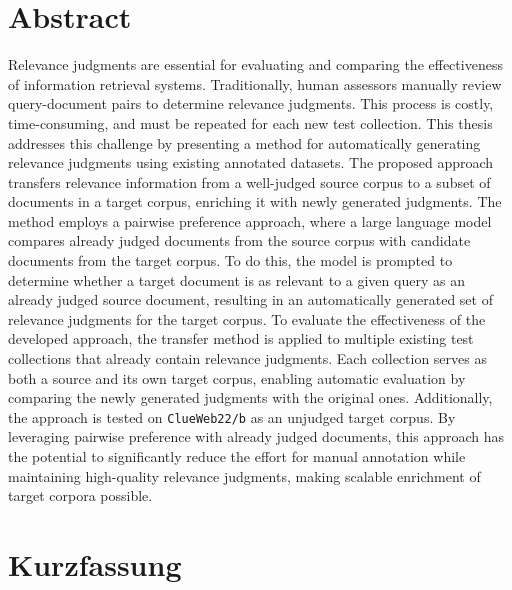 \section*{Abstract}

Relevance judgments are essential for evaluating and comparing the effectiveness of information retrieval systems. Traditionally, human assessors manually review query-document pairs to determine relevance judgments. This process is costly, time-consuming, and must be repeated for each new test collection. This thesis addresses this challenge by presenting a method for automatically generating relevance judgments using existing annotated datasets. The proposed approach transfers relevance information from a well-judged source corpus to a subset of documents in a target corpus, enriching it with newly generated judgments. The method employs a pairwise preference approach, where a large language model compares already judged documents from the source corpus with candidate documents from the target corpus. To do this, the model is prompted to determine whether a target document is as relevant to a given query as an already judged source document, resulting in an automatically generated set of relevance judgments for the target corpus. To evaluate the effectiveness of the developed approach, the transfer method is applied to multiple existing test collections that already contain relevance judgments. Each collection serves as both a source and its own target corpus, enabling automatic evaluation by comparing the newly generated judgments with the original ones. Additionally, the approach is tested on \texttt{ClueWeb22/b} as an unjudged target corpus. By leveraging pairwise preference with already judged documents, this approach has the potential to significantly reduce the effort for manual annotation while maintaining high-quality relevance judgments, making scalable enrichment of target corpora possible.

\pagebreak

\section*{Kurzfassung}


